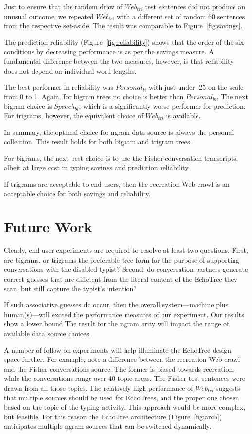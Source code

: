 \documentclass{sigchi}
\begin{document}
Just to ensure that the random draw of $Web_{tri}$ test sentences did
not produce an unusual outcome, we repeated $Web_{tri}$ with a
different set of random 60 sentences from the respective
set-aside. The result was comparable to Figure~\ref{fig:savings}.

The prediction reliability (Figure~\ref{fig:reliability}) shows that
the order of the six conditions by decreasing performance is as per the
savings measure. A fundamental difference between the two measures,
however, is that reliability does not depend on individual word
lengths. 

The best performer in reliability was $Personal_{bi}$ with just under
.25 on the scale from 0 to 1. Again, for bigram trees no choice is
better than $Personal_{bi}$. The next bigram choice is $Speech_{bi}$,
which is a significantly worse performer for prediction. For trigrams,
however, the equivalent choice of $Web_{tri}$ is available.

In summary, the optimal choice for ngram data source is always the
personal collection. This result holds for both bigram and trigram
trees. 

For bigrams, the next best choice is to use the Fisher
conversation transcripts, albeit at large cost in typing savings and
prediction reliability.

If trigrams are acceptable to end users, then the recreation Web crawl
is an acceptable choice for both savings and reliability.

\section{Future Work}

Clearly, end user experiments are required to resolve at least two
questions. First, are bigrams, or trigrams the preferable tree form
for the purpose of supporting conversations with the disabled typist?
Second, do conversation partners generate correct guesses that are
different from the literal content of the EchoTree they scan, but
still capture the typist's intention?

If such associative guesses do occur, then the overall
system---machine plus human(s)---will exceed the performance measures
of our experiment. Our results show a lower bound.The result for the
ngram arity will impact the range of available data source choices.

A number of follow-on experiments will help illuminate the EchoTree
design space further. For example, note a difference between the
recreation Web crawl and the Fisher conversations source. The former
is biased towards recreation, while the conversations range over 40
topic areas. The Fisher test sentences were drawn from all those
topics. The relatively high performance of $Web_{tri}$ suggests that
multiple sources should be used for EchoTrees, and the proper one
chosen based on the topic of the typing activity. This approach would
be more complex, but feasible. For this reason the EchoTree
architecture (Figure~\ref{fig:arch}) anticipates multiple ngram
sources that can be switched dynamically.
\end{document}
